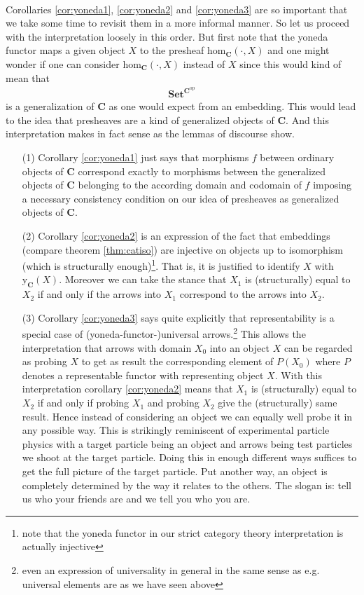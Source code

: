 \\
Corollaries \ref{cor:yoneda1}, \ref{cor:yoneda2} and \ref{cor:yoneda3} are so important that we take some time to revisit them in a more informal manner. So let us proceed with the interpretation loosely in this order. But first note that the yoneda functor maps a given object $X$ to the presheaf $\mathrm{hom}_{\mathbf{C}}(\cdot,X)$ and one might wonder if one can consider $\mathrm{hom}_{\mathbf{C}}(\cdot,X)$ instead of $X$ since this would kind of mean that
\begin{align*}
  \mathbf{Set}^{\mathbf{C}^{\mathrm{op}}}
\end{align*}
is a generalization of $\mathbf{C}$ as one would expect from an embedding. This would lead to the idea that presheaves are a kind of {\glqq}generalized objects of $\mathbf{C}${\grqq}. And this interpretation makes in fact sense as the lemmas of discourse show.
\begin{enumerate}
\item[(1)]
Corollary \ref{cor:yoneda1} just says that morphisms $f$ between {\glqq}ordinary objects of $\mathbf{C}${\grqq} correspond exactly to morphisms between the {\glqq}generalized objects of $\mathbf{C}${\grqq} belonging to the according domain and codomain of $f$ imposing a necessary consistency condition on our idea of presheaves as {\glqq}generalized objects of $\mathbf{C}${\grqq}.
\item[(2)]
Corollary \ref{cor:yoneda2} is an expression of the fact that embeddings (compare theorem \ref{thm:catiso}) are injective on objects up to isomorphism (which is structurally enough)\footnote{note that the yoneda functor in our strict category theory interpretation is actually injective}. That is, it is justified to identify $X$ with $\mathrm{y}_{\mathbf{C}}(X)$. Moreover we can take the stance that $X_{1}$ is (structurally) equal to $X_{2}$ if and only if the arrows into $X_{1}$ correspond to the arrows into $X_{2}$.
\item[(3)]
Corollary \ref{cor:yoneda3} says quite explicitly that representability is a special case of (yoneda-functor-)universal arrows.\footnote{even an expression of universality in general in the same sense as e.g. universal elements are as we have seen above} This allows the interpretation that arrows with domain $X_{0}$ into an object $X$ can be regarded as probing $X$ to get as result the corresponding element of $P(X_{0})$ where $P$ denotes a representable functor with representing object $X$. With this interpretation corollary \ref{cor:yoneda2} means that $X_{1}$ is (structurally) equal to $X_{2}$ if and only if probing $X_{1}$ and probing $X_{2}$ give the (structurally) same result. Hence instead of considering an object we can equally well probe it in any possible way. This is strikingly reminiscent of experimental particle physics with a target particle being an object and arrows being test particles we shoot at the target particle. Doing this in enough different ways suffices to get the full picture of the target particle. Put another way, an object is completely determined by the way it relates to the others. The slogan is: tell us who your friends are and we tell you who you are.
\end{enumerate}
